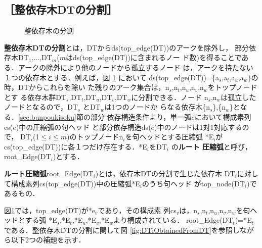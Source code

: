 \subsection*{［整依存木{\rm DT}の分割］}

\begin{figure}[t]
 \begin{center}
 \end{center}
\myfiglabelskip
\myfiglabelskippre
\caption{整依存木の分割}
\myfiglabelskippost
\label{fig:DTGraphDivision}
\end{figure}

{\bf 整依存木DTの分割}とは，DTからds(top\_edge(DT))のアークを除外し，
部分依存木DT$_1$,${\ldots}$,DT$_m$($m$はds(top\_edge(DT))に含まれるノー
ド数)を得ることである．アークの除外により他のノードから孤立するノード
は，アークを持たない１つの依存木とする．例えば，図
\ref{fig:DTGraphDivision} において
ds(top\_edge(DT))=\{a$_s$,a$_t$,a$_u$,a$_w$\}の時，DTからこれらを除い
た残りのアーク集合は，n$_s$,n$_t$,n$_u$,n$_v$,n$_w$をトップノードとす
る依存木群DT$_s$,DT$_t$,DT$_u$,DT$_v$,DT$_w$に分割できる．ノード
n$_s$,n$_w$は孤立したノードとなるので，DT$_s$ とDT$_w$は1つのノードか
らなる依存木\{n$_s$\},\{n$_w$\}となる．\ref{sec:bunpoukisoku}節の部分
依存構造条件より，単一弧$e$において構成素列cs($e$)中の圧縮弧の句ヘッド
と部分依存構造ds($e$)中のノードは1対1対応するので，
DT$_i$(1${\leq}i{\leq}m$)のトップノードn$_i$を句ヘッドとする圧縮弧
*E$_i$がcs(top\_edge(DT))に各１つだけ存在する．*E$_i$をDT$_i$ の{\bf ルート
圧縮弧}と呼び，root\_Edge(DT$_i$)とする．

\begin{definition}
{\bf ルート圧縮弧}root\_Edge(DT$_i$)とは，依存木DTの分割で生じた依存木
DT$_i$に対して構成素列cs(top\_edge(DT))中の圧縮弧*E$_i$のうち句ヘッド
がtop\_node(DT$_i$)であるもの．
\end{definition}

図\ref{fig:DTGraphDivision}では，top\_edge(DT)が*e$_v$であり，その構成素
列cs$_v$は，n$_s$,n$_t$,n$_u$,n$_v$,n$_w$を句ヘッドとする弧
*E$_s$,*E$_t$,*E$_u$,*E$_v$,*E$_w$より構成されている．
root\_Edge(DT$_t$)=*E$_t$である．整依存木DTの分割に関して図
\ref{fig:DTiObtainedFromDT}を参照しながら以下2つの補題を示す．

\begin{comment}
\myhalfskip
\hspace{-5mm}
\fbox
{
\begin{minipage}{13.7cm}
\mygapskip
依存木分割と圧縮弧
\begin{itemize}
\item[\myitemindent root\_Edge(DT$_i$)] : ルート圧縮弧．依存木DTの分割で生じた依存木DT$_i$に対して
構成素列cs(top\_edge(DT))中の圧縮弧*E$_i$のうち句ヘッドがtop\_node(DT$_i$)であるもの．
\end{itemize}
\myhalfskip
\end{minipage}
}
\myhalfskip
\end{comment}

